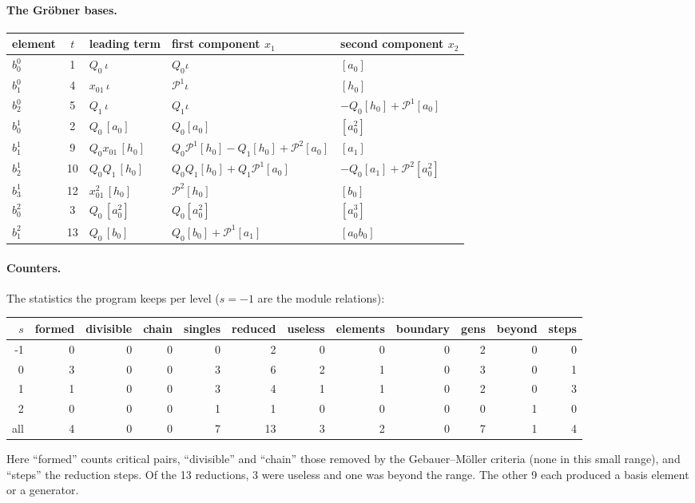 \documentclass[11pt]{article}
\renewcommand{\P}{\mathcal{P}}
\begin{document}
\paragraph{The Gröbner bases.}
\begin{center}
\small
\begin{longtable}{lclll}
\toprule
element & $t$ & leading term & first component $x_1$ & second component $x_2$ \\
\midrule
$b^{0}_{0}$ & 1 & $Q_{0}\,\iota$ & $Q_{0}\iota$ & $[a_0]$ \\
$b^{0}_{1}$ & 4 & $x_{01}\,\iota$ & $\P^{1}\iota$ & $[h_0]$ \\
$b^{0}_{2}$ & 5 & $Q_{1}\,\iota$ & $Q_{1}\iota$ & $-Q_{0}[h_0] + \P^{1}[a_0]$ \\
$b^{1}_{0}$ & 2 & $Q_{0}\,[a_0]$ & $Q_{0}[a_0]$ & $[a_0^2]$ \\
$b^{1}_{1}$ & 9 & $Q_{0}x_{01}\,[h_0]$ & $Q_{0}\P^{1}[h_0] - Q_{1}[h_0] + \P^{2}[a_0]$ & $[a_1]$ \\
$b^{1}_{2}$ & 10 & $Q_{0}Q_{1}\,[h_0]$ & $Q_{0}Q_{1}[h_0] + Q_{1}\P^{1}[a_0]$ & $-Q_{0}[a_1] + \P^{2}[a_0^2]$ \\
$b^{1}_{3}$ & 12 & $x_{01}^{2}\,[h_0]$ & $\P^{2}[h_0]$ & $[b_0]$ \\
$b^{2}_{0}$ & 3 & $Q_{0}\,[a_0^2]$ & $Q_{0}[a_0^2]$ & $[a_0^3]$ \\
$b^{2}_{1}$ & 13 & $Q_{0}\,[b_0]$ & $Q_{0}[b_0] + \P^{1}[a_1]$ & $[a_0b_0]$ \\
\bottomrule
\end{longtable}
\end{center}

\paragraph{Counters.}
The statistics the program keeps per level ($s = -1$ are the module relations):
\begin{center}
\footnotesize\setlength{\tabcolsep}{3.5pt}
\begin{tabular}{rrrrrrrrrrrr}
\toprule
$s$ & formed & divisible & chain & singles & reduced & useless & elements & boundary & gens & beyond & steps \\
\midrule
-1 & 0 & 0 & 0 & 0 & 2 & 0 & 0 & 0 & 2 & 0 & 0 \\
0 & 3 & 0 & 0 & 3 & 6 & 2 & 1 & 0 & 3 & 0 & 1 \\
1 & 1 & 0 & 0 & 3 & 4 & 1 & 1 & 0 & 2 & 0 & 3 \\
2 & 0 & 0 & 0 & 1 & 1 & 0 & 0 & 0 & 0 & 1 & 0 \\
all & 4 & 0 & 0 & 7 & 13 & 3 & 2 & 0 & 7 & 1 & 4 \\
\bottomrule
\end{tabular}
\end{center}
Here ``formed'' counts critical pairs, ``divisible'' and ``chain'' those removed by the
Gebauer--Möller criteria (none in this small range), and ``steps'' the reduction steps. Of the
13 reductions, 3 were useless and one was beyond the range. The other 9 each produced a basis
element or a generator.
\end{document}

